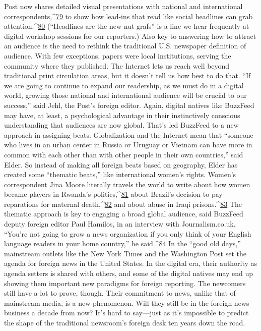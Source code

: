 Post now shares detailed visual presentations with national and international
correspondents,^{\href{#endnotes}{79}} to show how lead-ins that read like social headlines can grab attention.^{\href{#endnotes}{80}}
(``Headlines are the new nut grafs'' is a line we hear frequently at digital workshop
sessions for our reporters.)
Also key to answering how to attract an audience is the need to rethink the traditional
U.S. newspaper definition of audience. With few exceptions, papers were local
institutions, serving the community where they published. The Internet lets us reach well
beyond traditional print circulation areas, but it doesn’t tell us how best to do that. ``If we
are going to continue to expand our readership, as we must do in a digital world, growing
those national and international audience will be crucial to our success,'' said Jehl, the
Post’s foreign editor.
Again, digital natives like BuzzFeed may have, at least, a psychological advantage in
their instinctively conscious understanding that audiences are now global. That’s led
BuzzFeed to a new approach in assigning beats. Globalization and the Internet mean that
``someone who lives in an urban center in Russia or Uruguay or Vietnam can have more
in common with each other than with other people in their own countries,'' said Elder. So
instead of making all foreign beats based on geography, Elder has created some ``thematic
beats,'' like international women’s rights. Women’s correspondent Jina Moore literally
travels the world to write about how women became players in Rwanda’s politics,^{\href{#endnotes}{81}} about
Brazil’s decision to pay reparations for maternal death,^{\href{#endnotes}{82}} and about abuse in Iraqi
prisons.^{\href{#endnotes}{83}}
The thematic approach is key to engaging a broad global audience, said BuzzFeed deputy
foreign editor Paul Hamilos, in an interview with Journalism.co.uk. ``You’re not going to
grow a news organization if you only think of your English language readers in your
home country,'' he said.^{\href{#endnotes}{84}}
In the ``good old days,'' mainstream outlets like the New York Times and the Washington
Post set the agenda for foreign news in the United States. In the digital era, their authority
as agenda setters is shared with others, and some of the digital natives may end up
showing them important new paradigms for foreign reporting.
The newcomers still have a lot to prove, though. Their commitment to news, unlike that
of mainstream media, is a new phenomenon. Will they still be in the foreign news
business a decade from now? It’s hard to say—just as it’s impossible to predict the shape
of the traditional newsroom’s foreign desk ten years down the road.
